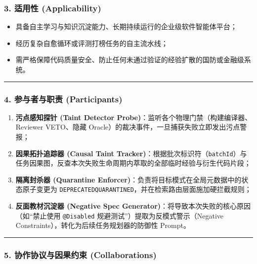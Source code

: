 \documentclass[
]{ctexart}
\providecommand{\tightlist}{%
  \setlength{\itemsep}{0pt}\setlength{\parskip}{0pt}}
\renewcommand{\_}{\discretionary{}{}{\textunderscore}}
\begin{document}
\subsubsection{3. 适用性
(Applicability)}\label{ux9002ux7528ux6027-applicability-14}

\begin{itemize}
\tightlist
\item
  具备自主学习与知识沉淀能力、长期持续运行的企业级软件智能体平台；
\item
  经历复杂自愈循环或评测打榜任务的自主流水线；
\item
  需严格保障代码质量安全、防止任何未通过验证的经验扩散的国防或金融级系统。
\end{itemize}

\begin{center}\rule{0.5\linewidth}{0.5pt}\end{center}

\subsubsection{4. 参与者与职责
(Participants)}\label{ux53c2ux4e0eux8005ux4e0eux804cux8d23-participants-14}

\begin{enumerate}
\def\labelenumi{\arabic{enumi}.}
\tightlist
\item
  \textbf{污点感知探针 (Taint Detector
  Probe)}：监听各个物理门禁（构建编译器、Reviewer VETO、隐藏
  Oracle）的裁决事件，一旦捕获失败立即发出污点警报；
\item
  \textbf{因果拓扑追踪器 (Causal Taint
  Tracker)}：根据批次标识符（\texttt{batchId}）与任务因果图，反查本次失败生命周期内萃取的全部临时经验与衍生代码片段；
\item
  \textbf{隔离封杀器 (Quarantine
  Enforcer)}：负责将目标模式在全局元数据中的状态原子变更为
  \texttt{DEPRECATED\_QUARANTINED}，并在检索路由层面施加硬拦截规则；
\item
  \textbf{反面教材沉淀器 (Negative Spec
  Generator)}：将导致本次失败的核心原因（如``禁止使用 \texttt{@Disabled}
  规避测试''）提取为反模式警示（Negative
  Constraints），转化为后续任务规划器的防御性 Prompt。
\end{enumerate}

\begin{center}\rule{0.5\linewidth}{0.5pt}\end{center}

\subsubsection{5. 协作协议与因果约束
(Collaborations)}\label{ux534fux4f5cux534fux8baeux4e0eux56e0ux679cux7ea6ux675f-collaborations-11}
\end{document}

